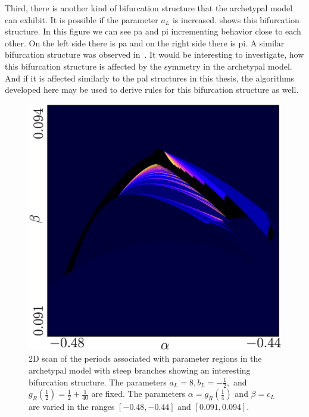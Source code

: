 Third, there is another kind of bifurcation structure that the archetypal model can exhibit.
It is possible if the parameter $a_L$ is increased.
 shows this bifurcation structure.
In this figure we can see \gls{pa} and \gls{pi} incrementing behavior close to each other.
On the left side there is \gls{pa} and on the right side there is \gls{pi}.
A similar bifurcation structure was observed in~\cite{AvrSchBan06}.
It would be interesting to investigate, how this bifurcation structure is affected by the symmetry in the archetypal model.
And if it is affected similarly to the \gls{pal} structures in this thesis, the algorithms developed here may be used to derive rules for this bifurcation structure as well.

\begin{figure}
	\centering
	\includegraphics[width=.7 \textwidth]{../Figures/8/8.1/result.png}
	\caption[2D scan of the periods associated with parameter regions in the archetypal model with steep branches showing an interesting bifurcation structure]{
		2D scan of the periods associated with parameter regions in the archetypal model with steep branches showing an interesting bifurcation structure.
		The parameters $a_L = 8, b_L = -\frac{1}{2},$ and $g_R\left(\frac{1}{2}\right) = \frac{1}{2} + \frac{1}{40}$ are fixed.
		The parameters $\alpha = g_R\left(\frac{1}{4}\right)$ and $\beta = c_L$ are varied in the ranges $[-0.48, -0.44]$ and $[0.091, 0.094]$.
	}
	\label{fig:concl.fut.addincr}
\end{figure}

